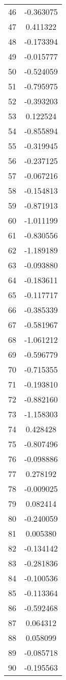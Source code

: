 \documentclass[12pt]{article}
\begin{document}
\begin{longtable}{@{}cc@{}}
46 & -0.363075 \\
47 & 0.411322 \\
48 & -0.173394 \\
49 & -0.015777 \\
50 & -0.524059 \\
51 & -0.795975 \\
52 & -0.393203 \\
53 & 0.122524 \\
54 & -0.855894 \\
55 & -0.319945 \\
56 & -0.237125 \\
57 & -0.067216 \\
58 & -0.154813 \\
59 & -0.871913 \\
60 & -1.011199 \\
61 & -0.830556 \\
62 & -1.189189 \\
63 & -0.093880 \\
64 & -0.183611 \\
65 & -0.117717 \\
66 & -0.385339 \\
67 & -0.581967 \\
68 & -1.061212 \\
69 & -0.596779 \\
70 & -0.715355 \\
71 & -0.193810 \\
72 & -0.882160 \\
73 & -1.158303 \\
74 & 0.428428 \\
75 & -0.807496 \\
76 & -0.098886 \\
77 & 0.278192 \\
78 & -0.009025 \\
79 & 0.082414 \\
80 & -0.240059 \\
81 & 0.005380 \\
82 & -0.134142 \\
83 & -0.281836 \\
84 & -0.100536 \\
85 & -0.113364 \\
86 & -0.592468 \\
87 & 0.064312 \\
88 & 0.058099 \\
89 & -0.085718 \\
90 & -0.195563 \\

\end{longtable}
\end{document}
